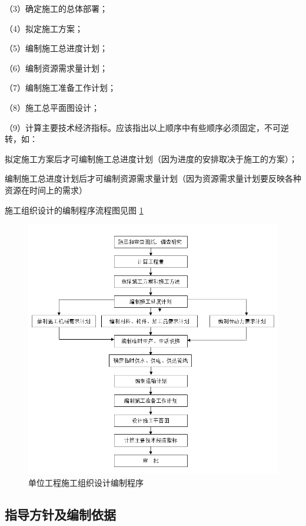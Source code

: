 （3）确定施工的总体部署；

（4）拟定施工方案；

（5）编制施工总进度计划；

（6）编制资源需求量计划；

（7）编制施工准备工作计划；

（8）施工总平面图设计；

（9）计算主要技术经济指标。应该指出以上顺序中有些顺序必须固定，不可逆转，如：

 拟定施工方案后才可编制施工总进度计划（因为进度的安排取决于施工的方案）；

 编制施工总进度计划后才可编制资源需求量计划（因为资源需求量计划要反映各种资源在时间上的需求）

施工组织设计的编制程序流程图见图 \ref{fig:c1f1}

\begin{figure}[thbp!]
    \centering
    \includegraphics[width=1.0\linewidth]{figure/c1f1.png}
    \caption{单位工程施工组织设计编制程序}
    \label{fig:c1f1}
\end{figure}

\subsection{指导方针及编制依据}

